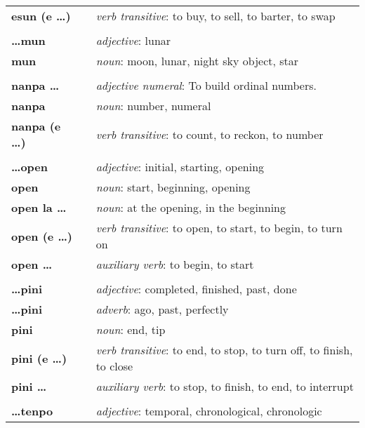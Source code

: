 \begin{supertabular}{p{2,5cm}|ll}
\textbf{esun (e \dots)} && \textit{verb transitive}: to buy, to sell, to barter, to swap \\ %
 && \\ %
%
\textbf{\dots mun} && \textit{adjective}: lunar \\ %
\textbf{mun} && \textit{noun}: moon, lunar, night sky object, star \\ %
 && \\ %
%
\textbf{nanpa \dots} && \textit{adjective numeral}: To build ordinal numbers. \\ %
\textbf{nanpa} && \textit{noun}: number, numeral \\ %
\textbf{nanpa (e \dots)} && \textit{verb transitive}: to count, to reckon,  to number \\ %
 && \\ %
%
\textbf{\dots open} && \textit{adjective}: initial, starting, opening \\ %
\textbf{open} && \textit{noun}: start, beginning, opening \\ %
\textbf{open la \dots} && \textit{noun}: at the opening, in the beginning  \\ %
\textbf{open (e \dots)} && \textit{verb transitive}: to open, to start, to begin, to turn on \\ %
\textbf{open \dots } && \textit{auxiliary verb}: to begin, to start \\ %
 && \\ %
%
\textbf{\dots pini} && \textit{adjective}: completed, finished, past, done \\ %
\textbf{\dots pini} && \textit{adverb}: ago, past, perfectly \\ %
\textbf{pini} && \textit{noun}: end, tip \\ %
\textbf{pini (e \dots)} && \textit{verb transitive}: to end, to stop, to turn off, to finish, to close \\ %
\textbf{pini \dots } && \textit{auxiliary verb}: to stop, to finish, to end, to interrupt \\ %
 && \\ %
%
\textbf{\dots tenpo} && \textit{adjective}: temporal, chronological, chronologic \\ %

\end{supertabular}
